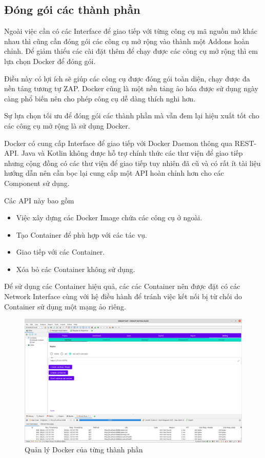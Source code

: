 \documentclass[./../main.tex]{subfiles}
\begin{document}
\subsection{Đóng gói các thành phần}

Ngoài việc cần có các Interface để giao tiếp với từng công cụ mã nguồn mở khác nhau thì cũng cần đóng gói các công cụ mở rộng vào thành một Addons hoàn chỉnh. Để giảm thiểu các cài đặt thêm để chạy được các công cụ mở rộng thì em lựa chọn Docker để đóng gói.

Điều này có lợi ích sẽ giúp các công cụ được đóng gói toàn diện, chạy được đa nền tảng tương tự ZAP. Docker cũng là một nền tảng ảo hóa được sử dụng ngày càng phổ biến nên cho phép công cụ dễ dàng thích nghi hơn.

Sự lựa chọn tối ưu để đóng gói các thành phần mà vẫn đem lại hiệu xuất tốt cho các công cụ mở rộng là sử dụng Docker.

Docker có cung cấp Interface để giao tiếp với Docker Daemon thông qua REST-API. Java và Kotlin không được hỗ trợ chính thức các thư viện để giao tiếp nhưng cộng đồng có các thư viện để giao tiếp tuy nhiên đã cũ và có rất ít tài liệu hướng dẫn nên cần bọc lại cung cấp một API hoàn chỉnh hơn cho các Component sử dụng.

Các API này bao gồm
\begin{itemize}
	\item Việc xây dựng các Docker Image chứa các công cụ ở ngoài.
	\item Tạo Container để phù hợp với các tác vụ.
	\item Giao tiếp với các Container.
	\item Xóa bỏ các Container không sử dụng.
\end{itemize}

Để sử dụng các Container hiệu quả, các các Container nên được đặt có các Network Interface cùng với hệ điều hành để tránh việc kết nối bị từ chối do Container sử dụng một mạng ảo riêng.

\begin{figure}[H]
	\includegraphics[width=\linewidth]{./images/docker.png}
	\caption{Quản lý Docker của từng thành phần}
	\label{fig:docker}
\end{figure}
\end{document}
